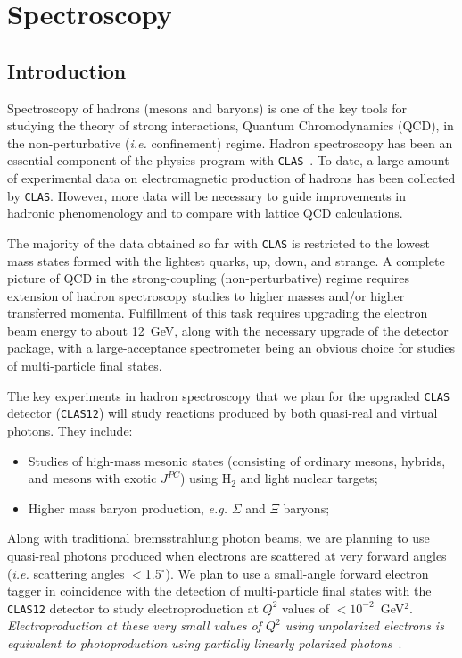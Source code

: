 \chapter{Spectroscopy}

\section{Introduction}

Spectroscopy of hadrons (mesons and baryons) is one of the key tools
for studying the theory of strong interactions, Quantum Chromodynamics 
(QCD), in the non-perturbative ({\it i.e.} confinement) regime. Hadron 
spectroscopy has been an essential component of the physics program with 
{\tt CLAS}~\cite{clas3pi,clas-d,clas-p,Tho01,McN04,Pri04,Guo07,5st}. To 
date, a large amount of experimental data on electromagnetic production of 
hadrons has been collected by {\tt CLAS}. However, more data will be 
necessary to guide improvements in hadronic phenomenology and to compare 
with lattice QCD calculations.

The majority of the data obtained so far with {\tt CLAS} is restricted to
the lowest mass states formed with the lightest quarks, up, down, and 
strange. A complete picture of QCD in the strong-coupling (non-perturbative) 
regime requires extension of hadron spectroscopy studies to higher masses 
and/or higher transferred momenta. Fulfillment of this task requires 
upgrading the electron beam energy to about 12~GeV, along with the necessary 
upgrade of the detector package, with a large-acceptance spectrometer being 
an obvious choice for studies of multi-particle final states.

The key experiments in hadron spectroscopy that we plan for the upgraded 
{\tt CLAS} detector ({\tt CLAS12}) will study reactions produced by both 
quasi-real and virtual photons.  They include:

\begin{itemize}

\item Studies of high-mass mesonic states (consisting of ordinary mesons, 
hybrids, and mesons with exotic $J^{PC}$) using H$_2$ and light nuclear 
targets;

\item Higher mass baryon production, {\it e.g.} $\Sigma$ and $\Xi$ baryons; 

\end{itemize}

Along with traditional bremsstrahlung photon beams, we are planning to 
use quasi-real photons produced when electrons are scattered at very 
forward angles ({\it i.e.} scattering angles $<$1.5$^\circ$). We plan to 
use a small-angle forward electron tagger in coincidence with the detection 
of multi-particle final states with the {\tt CLAS12} detector to study 
electroproduction at $Q^2$ values of $<10^{-2}$~GeV$^2$.  
{\it Electroproduction at these very small values of $Q^2$ using 
unpolarized electrons is equivalent to photoproduction using partially 
linearly polarized photons}~\cite{Dom69}.

